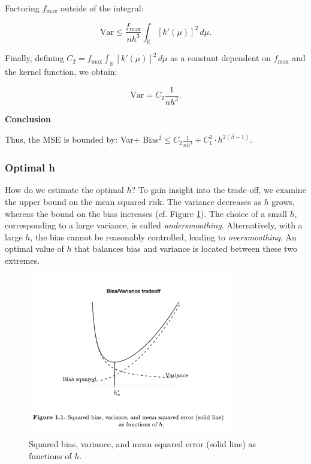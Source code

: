 \documentclass{article}
\begin{document}
Factoring \(f_{\text{max}}\) outside of the integral:

\[
\text{Var} \leq \frac{f_{\text{max}}}{n h^3} \int_{\mathbb{R}} \left[k'(\mu)\right]^2 \, d\mu.
\]

Finally, defining \(C_2 = f_{\text{max}} \int_{\mathbb{R}} \left[k'(\mu)\right]^2 \, d\mu\) as a constant dependent on \(f_{\text{max}}\) and the kernel function, we obtain:

\[
\text{Var} = C_2 \frac{1}{n h^3}.
\]


\textbf{Conclusion}

Thus, the MSE is bounded by: Var+ Bias\(^{2}\leq C_{2}\frac{1}{nh^{3}} +C_1^{2} \cdot h^{2(\beta - 1)}\). \\ 

\subsubsection{Optimal h}


How do we estimate the optimal $h$? To gain insight into the trade-off, we examine the upper bound on the mean squared risk. The variance decreases as $h$ grows, whereas the bound on the bias increases (cf. Figure \ref{fig:tradeoff}). The choice of a small $h$, corresponding to a large variance, is called \textit{undersmoothing}. Alternatively, with a large $h$, the bias cannot be reasonably controlled, leading to \textit{oversmoothing}. An optimal value of $h$ that balances bias and variance is located between these two extremes.

\begin{figure}[h]
    \centering
    \includegraphics[width=0.8\textwidth]{trade_off_nonparametrics.png} %
    \caption{Squared bias, variance, and mean squared error (solid line) as functions of $h$.}
    \label{fig:tradeoff}
\end{figure}
\end{document}
